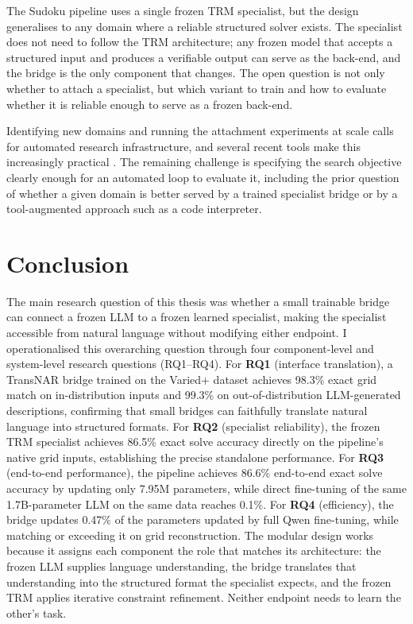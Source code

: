 \documentclass[11pt]{article}
\begin{document}
The Sudoku pipeline uses a single frozen TRM specialist, but the design generalises to any domain where a reliable structured solver exists.
The specialist does not need to follow the TRM architecture; any frozen model that accepts a structured input and produces a verifiable output can serve as the back-end, and the bridge is the only component that changes.
The open question is not only whether to attach a specialist, but which variant to train and how to evaluate whether it is reliable enough to serve as a frozen back-end.

Identifying new domains and running the attachment experiments at scale calls for automated research infrastructure, and several recent tools make this increasingly practical \cite{andrejKarpathyAutoresearch2026,HuggingfaceMlintern2026,GoogledeepmindSimply2026,yangARISAutonomousResearch2026}.
The remaining challenge is specifying the search objective clearly enough for an automated loop to evaluate it, including the prior question of whether a given domain is better served by a trained specialist bridge or by a tool-augmented approach such as a code interpreter.

\section{Conclusion}
\label{sec:conclusion}

The main research question of this thesis was whether a small trainable bridge can connect a frozen LLM to a frozen learned specialist, making the specialist accessible from natural language without modifying either endpoint. I operationalised this overarching question through four component-level and system-level research questions (RQ1--RQ4).
For \textbf{RQ1} (interface translation), a TransNAR bridge trained on the Varied+ dataset achieves 98.3\% exact grid match on in-distribution inputs and 99.3\% on out-of-distribution LLM-generated descriptions, confirming that small bridges can faithfully translate natural language into structured formats.
For \textbf{RQ2} (specialist reliability), the frozen TRM specialist achieves 86.5\% exact solve accuracy directly on the pipeline's native grid inputs, establishing the precise standalone performance.
For \textbf{RQ3} (end-to-end performance), the pipeline achieves 86.6\% end-to-end exact solve accuracy by updating only 7.95M parameters, while direct fine-tuning of the same 1.7B-parameter LLM on the same data reaches 0.1\%.
For \textbf{RQ4} (efficiency), the bridge updates 0.47\% of the parameters updated by full Qwen fine-tuning, while matching or exceeding it on grid reconstruction.
The modular design works because it assigns each component the role that matches its architecture: the frozen LLM supplies language understanding, the bridge translates that understanding into the structured format the specialist expects, and the frozen TRM applies iterative constraint refinement.
Neither endpoint needs to learn the other's task.
\end{document}
